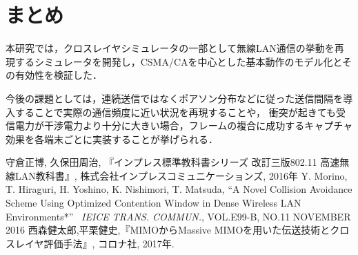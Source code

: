 \documentclass[a4paper, 10pt]{ltjsarticle}
\begin{document}
\section{まとめ}
本研究では，クロスレイヤシミュレータの一部として無線LAN通信の挙動を再現するシミュレータを開発し，CSMA/CAを中心とした基本動作のモデル化とその有効性を検証した．

今後の課題としては，連続送信ではなくポアソン分布などに従った送信間隔を導入することで実際の通信頻度に近い状況を再現することや，
衝突が起きても受信電力が干渉電力より十分に大きい場合，フレームの複合に成功するキャプチャ効果を各端末ごとに実装することが挙げられる．







\begin{thebibliography}{9}
  守倉正博, 久保田周治, 『インプレス標準教科書シリーズ 改訂三版802.11 高速無線LAN教科書』, 株式会社インプレスコミュニケーションズ, 2016年
  Y. Morino, T. Hiraguri, H. Yoshino, K. Nishimori, T. Matsuda, ``A Novel Collision Avoidance Scheme Using Optimized Contention Window in Dense Wireless LAN Environments*'' \, \textit{IEICE TRANS. COMMUN.}, VOL.E99-B, NO.11 NOVEMBER 2016
  西森健太郎,平栗健史,『MIMOからMassive MIMOを用いた伝送技術とクロスレイヤ評価手法』, コロナ社, 2017年.
\end{thebibliography}
\end{document}
